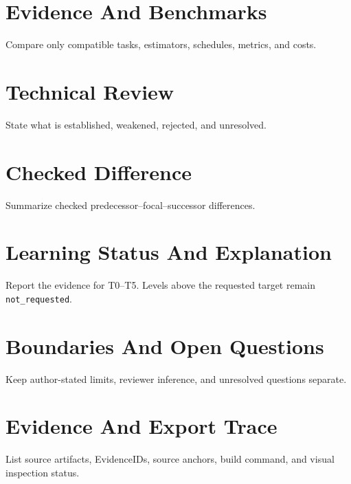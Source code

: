 \documentclass[11pt]{article}
\begin{document}
\section{Evidence And Benchmarks}
Compare only compatible tasks, estimators, schedules, metrics, and costs.

\section{Technical Review}
State what is established, weakened, rejected, and unresolved.

\section{Checked Difference}
Summarize checked predecessor--focal--successor differences.

\section{Learning Status And Explanation}
Report the evidence for T0--T5. Levels above the requested target remain
\texttt{not\_requested}.

\section{Boundaries And Open Questions}
Keep author-stated limits, reviewer inference, and unresolved questions
separate.

\appendix
\section{Evidence And Export Trace}
List source artifacts, EvidenceIDs, source anchors, build command, and visual
inspection status.
\end{document}
